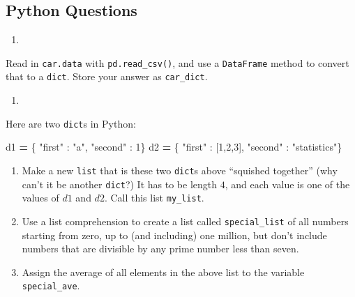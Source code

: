 \documentclass[
  12pt,
  krantz2]{krantz}
\makeatletter
\newenvironment{Shaded}{\begin{snugshade}}{\end{snugshade}}
\newcommand{\DecValTok}[1]{\textcolor[rgb]{0.06,0.06,0.06}{#1}}
\newcommand{\NormalTok}[1]{#1}
\newcommand{\OperatorTok}[1]{\textcolor[rgb]{0.43,0.43,0.43}{\textbf{#1}}}
\newcommand{\StringTok}[1]{\textcolor[rgb]{0.5,0.5,0.5}{#1}}
\providecommand{\tightlist}{%
  \setlength{\itemsep}{0pt}\setlength{\parskip}{0pt}}
\newenvironment{kframe}{%
\medskip{}
\setlength{\fboxsep}{.8em}
 \def\at@end@of@kframe{}%
 \ifinner\ifhmode%
  \def\at@end@of@kframe{\end{minipage}}%
  \begin{minipage}{\columnwidth}%
 \fi\fi%
 \def\FrameCommand##1{\hskip\@totalleftmargin \hskip-\fboxsep
 \colorbox{shadecolor}{##1}\hskip-\fboxsep
     \hskip-\linewidth \hskip-\@totalleftmargin \hskip\columnwidth}%
 \MakeFramed {\advance\hsize-\width
   \@totalleftmargin\z@ \linewidth\hsize
   \@setminipage}}%
 {\par\unskip\endMakeFramed%
 \at@end@of@kframe}
\renewenvironment{Shaded}{\begin{kframe}}{\end{kframe}}
\makeatother
\begin{document}
\hypertarget{python-questions-3}{%
\subsection{Python Questions}\label{python-questions-3}}

\begin{enumerate}
\def\labelenumi{\arabic{enumi}.}
\tightlist
\item
\end{enumerate}

Read in \texttt{car.data} with \texttt{pd.read\_csv()}, and use a \texttt{DataFrame} method to convert that to a \texttt{dict}. Store your answer as \texttt{car\_dict}.

\begin{enumerate}
\def\labelenumi{\arabic{enumi}.}
\setcounter{enumi}{1}
\tightlist
\item
\end{enumerate}

Here are two \texttt{dict}s in Python:

\begin{Shaded}
\begin{Highlighting}[]
\NormalTok{d1 }\OperatorTok{=}\NormalTok{ \{ }\StringTok{"first"}\NormalTok{ : }\StringTok{"a"}\NormalTok{, }\StringTok{"second"}\NormalTok{ : }\DecValTok{1}\NormalTok{\}}
\NormalTok{d2 }\OperatorTok{=}\NormalTok{ \{ }\StringTok{"first"}\NormalTok{ : [}\DecValTok{1}\NormalTok{,}\DecValTok{2}\NormalTok{,}\DecValTok{3}\NormalTok{], }\StringTok{"second"}\NormalTok{ : }\StringTok{"statistics"}\NormalTok{\}}
\end{Highlighting}
\end{Shaded}

\begin{enumerate}
\def\labelenumi{\alph{enumi})}
\item
  Make a new \texttt{list} that is these two \texttt{dict}s above ``squished together'' (why can't it be another \texttt{dict}?) It has to be length \(4\), and each value is one of the values of \(d1\) and \(d2\). Call this list \texttt{my\_list}.
\item
  Use a list comprehension to create a list called \texttt{special\_list} of all numbers starting from zero, up to (and including) one million, but don't include numbers that are divisible by any prime number less than seven.
\item
  Assign the average of all elements in the above list to the variable \texttt{special\_ave}.
\end{enumerate}
\end{document}
